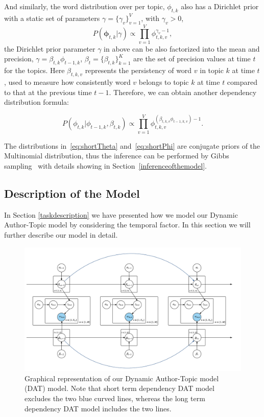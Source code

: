 And similarly, the word distribution over per topic, $\phi_{t, k}$ also has a Dirichlet prior with a static set of parameters $\gamma=\{\gamma_v\}_{v=1}^V$, with $\gamma_v>0$, 
\begin{equation}
\label{eq:assume2}
P(\boldsymbol{\phi}_{t, k} | \gamma) \propto \prod_{v=1}^V \phi_{t, k, v}^{\gamma_v -1},
\end{equation}
the Dirichlet prior parameter $\gamma$ in above can be also factorized into the mean and precision, $\gamma=\beta_{t, k} \phi_{t-1, k}$,  $\beta_t=\{\beta_{t, k}\}_{k=1}^K$ are the set of precision values at time $t$ for the topics. Here $\beta_{t, k, v}$ represents the persistency of word $v$ in topic $k$ at time $t$, used to measure how consistently word $v$ belongs to topic $k$ at time $t$ compared to that at the previous time $t-1$. Therefore, we can obtain another dependency distribution formula:

\begin{equation}
\label{eq:shortPhi}
P(\phi_{t, k} | \phi_{t-1, k}, \beta_{t, k}) \propto \prod_{v=1}^V \phi_{t, k, v}^{(\beta_{t, k, v} \phi_{t-1, k, v}) -1}.
\end{equation}

The distributions in~\eqref{eq:shortTheta} and~\eqref{eq:shortPhi} are conjugate priors of the Multinomial distribution, thus the inference can be performed by Gibbs sampling~\cite{liu1994collapsed} with details showing in Section~\ref{inferenceofthemodel}.
%
\subsection{Description of the Model}


In Section \ref{taskdescription} we have presented how we model our Dynamic Author-Topic model by considering the temporal factor. In this section we will further describe our model in detail. 

\begin{figure}[h]
\centering
\includegraphics[width=1.1\textwidth]{figures/ATOT_Graphic.png}
\caption{Graphical representation of our Dynamic Author-Topic model (DAT) model. Note that short term dependency DAT model excludes the two blue curved lines, whereas the long term dependency DAT model includes the two lines.}
\label{fig:atot}
\end{figure}


